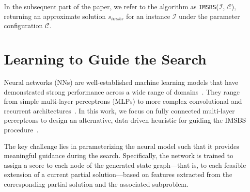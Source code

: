 \documentclass[runningheads]{llncs}
\begin{document}
	 
	 
	
	In the subsequent part of the paper, we refer to the algorithm as \texttt{IMSBS}($\mathcal{I}$, $\mathcal{C}$),  %
	returning an approximate solution $s_{imsbs}$ for an instance $\mathcal{I}$ under the parameter configuration $\mathcal{C}$.  %
 
   
\section{Learning to Guide the Search} \label{sec:ffnn_guidance}

Neural networks (NNs) are well-established machine learning models that have demonstrated strong performance across a wide range of domains~\cite{gurney2018introduction,bishop1994neural}. They range from simple multi-layer perceptrons (MLPs) to more complex convolutional and recurrent architectures~\cite{mienye2024recurrent}. In this work, we focus on fully connected multi-layer perceptrons to design an alternative, data-driven heuristic for guiding the IMSBS procedure~\cite{djukanovic2026_eurocast}. 

The key challenge lies in parameterizing the neural model such that it provides meaningful guidance during the search. Specifically, the network is trained to assign a score to each node of the generated state graph---that is, to each feasible extension of a current partial solution---based on features extracted from the corresponding partial solution and the associated subproblem.
\end{document}
